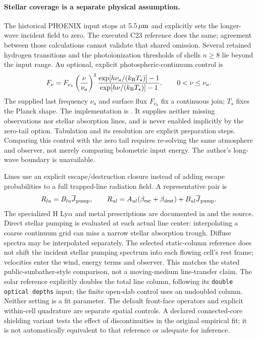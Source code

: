 \documentclass[10pt,a4paper]{article}
\begin{document}
\paragraph{Stellar coverage is a separate physical assumption.}
The historical PHOENIX input stops at $5.5\,\mu{\rm m}$ and explicitly
sets the longer-wave incident field to zero. The executed C23 reference
does the same; agreement between those calculations cannot validate that
shared omission. Several retained hydrogen transitions and the photoionization
thresholds of shells $n\geq8$ lie beyond the input range. An optional, explicit
photospheric-continuum control is
\begin{equation}
 F_\nu=F_{\nu_a}\left(\frac{\nu}{\nu_a}\right)^3
 \frac{\exp[h\nu_a/(k_{\rm B}T_\star)]-1}
      {\exp[h\nu/(k_{\rm B}T_\star)]-1},\qquad 0<\nu\leq\nu_a.
 \label{eq:stellar_ir_tail}
\end{equation}
The supplied last frequency $\nu_a$ and surface flux $F_{\nu_a}$ fix a
continuous join; $T_\star$ fixes the Planck shape. The implementation is
. It supplies
neither missing observations nor stellar absorption lines, and is never
enabled implicitly by the zero-tail option. Tabulation and its resolution
are explicit preparation steps. Comparing this control with the zero tail
requires re-solving the same atmosphere and observer, not merely comparing
bolometric input energy. The author's long-wave boundary is unavailable.

Lines use an explicit escape/destruction closure instead of adding escape
probabilities to a full trapped-line radiation field. A representative pair is
\begin{equation}
 R_{lu}=B_{lu}\overline J_{\rm pump},\qquad
 R_{ul}=A_{ul}(\beta_{\rm esc}+\beta_{\rm dest})
                +B_{ul}\overline J_{\rm pump}.
 \label{eq:line}
\end{equation}
The specialized H Ly$\alpha$ and metal prescriptions are documented in
 and the source. Direct stellar pumping is
evaluated at each actual line center: interpolating a coarse continuum grid
can miss a narrow stellar absorption trough. Diffuse spectra may be
interpolated separately. The selected static-column reference does not shift
the incident stellar pumping spectrum into each flowing cell's rest frame;
velocities enter the wind, energy terms and observer. This matches the stated
public-sunbather-style comparison, not a moving-medium line-transfer claim.
The solar reference explicitly doubles the total
line column, following its \texttt{double optical depths} input; the finite
open-slab control uses an undoubled column. Neither setting is a fit parameter.
The default front-face operators and explicit within-cell quadrature are
separate spatial controls. A declared connected-core shielding variant tests
the effect of discontinuities in the original empirical fit; it is not
automatically equivalent to that reference or adequate for inference.
\end{document}
